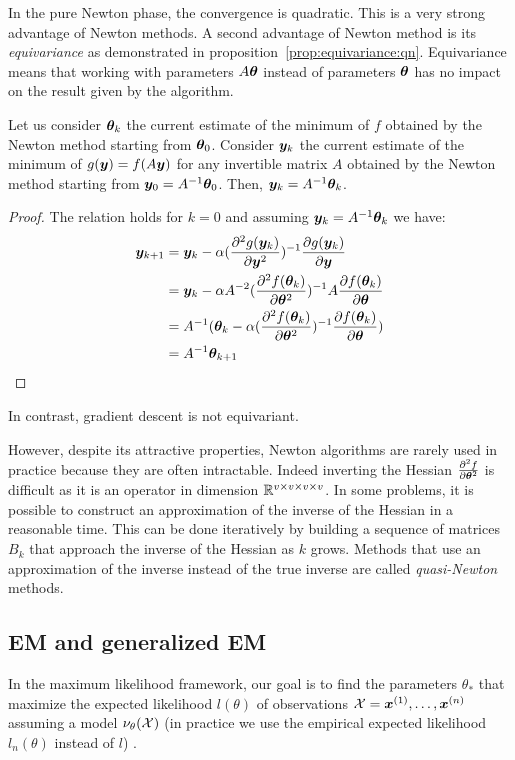 In the pure Newton phase, the convergence is quadratic. This is a very strong
advantage of Newton methods.
A second advantage of Newton method is its \emph{equivariance} as demonstrated
in proposition~\ref{prop:equivariance:qn}. Equivariance means that working with
parameters $A \thetab$ instead of parameters $\thetab$ has no impact on the result given
by the algorithm.
\begin{proposition}
  \label{prop:equivariance:qn}
  Let us consider $\thetab_k$ the current estimate of the minimum of $f$ obtained by
  the Newton method starting from $\thetab_0$.
  Consider $\yb_k$ the current estimate of the minimum of $g(\yb) = f(A\yb)$ for any
  invertible matrix $A$ obtained by the Newton method starting from $\yb_0 = A^{-1}\thetab_0$.
  Then, $\yb_k = A^{-1} \thetab_k$.
\end{proposition}
\begin{proof}
  The relation holds for $k=0$ and assuming $\yb_k = A^{-1} \thetab_k$ we have:
\begin{align}
  \yb_{k+1} &= \yb_k -\alpha (\partialfrac{\yb^2}{^2 g(\yb_k)})^{-1} \partialfrac{\yb}{g(\yb_k)} \\
  &= \yb_k -\alpha A^{-2}(\partialfrac{\thetab^2}{^2 f(\thetab_k)})^{-1} A \partialfrac{\thetab}{f(\thetab_k)} \\
  &= A^{-1} (\thetab_k -\alpha (\partialfrac{\thetab^2}{^2 f(\thetab_k)})^{-1} \partialfrac{\thetab}{f( \thetab_k)}) \\
            &= A^{-1} \thetab_{k+1} \\
\end{align}
\end{proof}
In contrast, gradient descent is not equivariant.

However, despite its attractive properties, Newton algorithms are rarely used in
practice because they are often intractable. Indeed inverting
the Hessian $\partialfrac{\thetab^2}{^2 f}$ is difficult as it is an operator in
dimension $\RR^{v \times v \times v \times
  v}$.
In some problems, it is possible to construct an approximation of the inverse of
the Hessian in a reasonable time. This can be done iteratively by building a
sequence of matrices $B_k$ that approach the inverse of the Hessian as $k$ grows.
Methods that use an approximation of the inverse instead of the true inverse are
called \emph{quasi-Newton} methods. 

\subsection{EM and generalized EM}
In the maximum likelihood framework, our goal is to find the parameters
$\theta_*$ that maximize the expected likelihood $l(\theta)$ of
observations $\Xcal = \xb^{(1)}, \dots, \xb^{(n)}$ assuming a model
$\nu_{\theta}(\Xcal)$ (in practice we use
the empirical expected likelihood $l_n(\theta)$ instead of $l$) .

